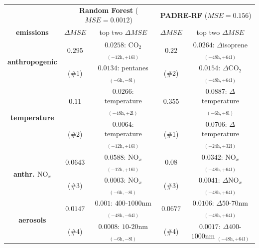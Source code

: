 \begin{table}[H]
    \centering
    \begin{tabular}{ccccc} \toprule
        \multicolumn{1}{l}{} & \multicolumn{2}{c}{\textbf{Random Forest} ($MSE = 0.0012$)} & \multicolumn{2}{c}{\textbf{PADRE-RF} ($MSE = 0.156$)} \\ \cmidrule(r){2-5}
        \multicolumn{1}{c}{\textbf{emissions}} & \multicolumn{1}{c}{$\Delta MSE$} & top two $\Delta MSE$ & \multicolumn{1}{c}{$\Delta MSE$} & top two $\Delta MSE$ \\ \midrule
        \multicolumn{1}{c}{\multirow{2}{*}{\textbf{anthropogenic}}} & \multicolumn{1}{c}{$0.295$} & $0.0258$: $\text{CO}_2$ $_{(-12\text{h}, +16\text{l})}$ & \multicolumn{1}{c}{$0.22$} & $0.0264$: $\Delta$isoprene $_{(-48\text{h},+64\text{l})}$ \\
        \multicolumn{1}{c}{} & \multicolumn{1}{c}{(\#1)} & $0.0134$: pentanes $_{(-6\text{h},-8\text{l})}$ & \multicolumn{1}{c}{(\#2)} & $0.0154$: $\Delta \text{CO}_2$ $_{(-48\text{h},+64\text{l})}$ \\
        \multicolumn{1}{c}{\multirow{2}{*}{\textbf{temperature}}} & \multicolumn{1}{c}{$0.11$} & $0.0266$: temperature $_{(-48\text{h},\pm 2\text{l})}$ & \multicolumn{1}{c}{$0.355$} & $0.0887$: $\Delta$temperature $_{(-6\text{h},+8\text{l})}$ \\
        \multicolumn{1}{c}{} & \multicolumn{1}{c}{(\#2)} & $0.0064$: temperature $_{(-12\text{h},+16\text{l})}$ & \multicolumn{1}{c}{(\#1)} & $0.0706$: $\Delta$temperature $_{(-24\text{h},+32\text{l})}$ \\
        \multicolumn{1}{c}{\multirow{2}{*}{\textbf{anthr. $\text{NO}_{x}$}}} & \multicolumn{1}{c}{$0.0643$} & $0.0588$: $\text{NO}_{x}$ $_{(-12\text{h},+16\text{l})}$ & \multicolumn{1}{c}{$0.08$} & $0.0342$: $\text{NO}_{x}$ $_{(-48\text{h},+64\text{l})}$ \\
        \multicolumn{1}{c}{} & \multicolumn{1}{c}{(\#3)} & $0.0003$: $\text{NO}_{x}$ $_{(-6\text{h},-8\text{l})}$ & \multicolumn{1}{c}{(\#3)} & $0.0041$: $\Delta\text{NO}_{x}$ $_{(-48\text{h},+64\text{l})}$ \\
        \multicolumn{1}{c}{\multirow{2}{*}{\textbf{aerosols}}} & \multicolumn{1}{c}{$0.0147$} & $0.001$: $400$-$1000\text{nm}$ $_{(-48\text{h},-64\text{l})}$ & \multicolumn{1}{c}{$0.0677$} & $0.0106$: $\Delta 50$-$70\text{nm}$ $_{(-48\text{h},+64\text{l})}$ \\
        \multicolumn{1}{c}{} & \multicolumn{1}{c}{(\#4)} & $0.0008$: $10$-$20\text{nm}$ $_{(-6\text{h},-8\text{l})}$ & \multicolumn{1}{c}{(\#4)} & $0.0017$: $\Delta 400$-$1000\text{nm}$ $_{(-48\text{h},+64\text{l})}$ \\

\end{tabular}
\end{table}
